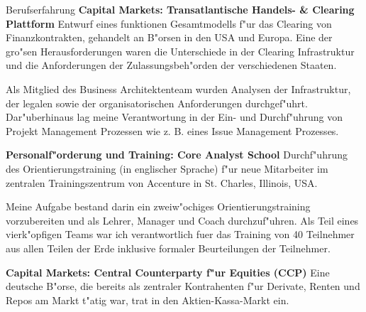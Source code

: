 \begin{rubric}{Berufserfahrung}
\entry*[07/2003 - 10/2003] \textbf{Capital Markets: Transatlantische Handels- \& Clearing Plattform}\newline
{} 
Entwurf eines funktionen Gesamtmodells f"ur das Clearing von Finanzkontrakten, gehandelt an B"orsen in den USA und Europa. Eine der gro"sen Herausforderungen waren die Unterschiede in der Clearing Infrastruktur und die Anforderungen der Zulassungsbeh"orden der verschiedenen Staaten.\axelvspace

Als Mitglied des Business Architektenteam wurden Analysen der Infrastruktur, der legalen sowie der organisatorischen Anforderungen durchgef"uhrt. Dar"uberhinaus lag meine Verantwortung in der Ein- und Durchf"uhrung von Projekt Management Prozessen wie z. B. eines Issue Management Prozesses.

\entry*[06/2003 - 07/2003] \textbf{Personalf"orderung und Training: Core Analyst School}\newline
{} 
Durchf"uhrung des Orientierungstraining (in englischer Sprache) f"ur neue Mitarbeiter im zentralen Trainingszentrum von  Accenture in St. Charles, Illinois, USA.\axelvspace

Meine Aufgabe bestand darin ein zweiw"ochiges Orientierungstraining vorzubereiten und als Lehrer, Manager und Coach durchzuf"uhren. Als Teil eines vierk"opfigen Teams war ich verantwortlich fuer das Training von 40 Teilnehmer aus allen Teilen der Erde inklusive formaler Beurteilungen der Teilnehmer.

\entry*[12/2001 - 06/2003] \textbf{Capital Markets: Central Counterparty f"ur Equities (CCP)}\newline
{} 
Eine deutsche B"orse, die bereits als zentraler Kontrahenten f"ur Derivate, Renten und Repos am Markt t"atig war, trat in den Aktien-Kassa-Markt ein. %


\end{rubric}
